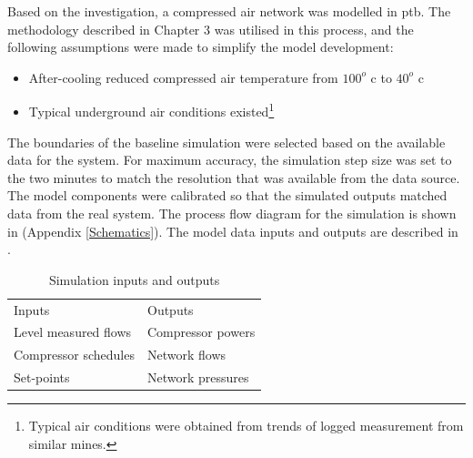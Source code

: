 Based on the investigation, a compressed air network was modelled in \gls{ptb}. The methodology described in Chapter 3 was utilised in this process, and the following assumptions were made to simplify the model development:
\begin{itemize}
	\item After-cooling reduced compressed air temperature from $ 100 ^o $ \gls{c} to $ 40 ^o $ \gls{c}
	\item Typical underground air conditions existed\footnote{Typical air conditions were obtained from trends of logged measurement from similar mines.}
\end{itemize}
 The boundaries of the baseline simulation were selected based on the available data for the system. For maximum accuracy, the simulation step size was set to the two minutes to match the resolution that was available from the data source.
The model components were calibrated so that the simulated outputs matched data from the real system. The process flow diagram for the simulation is shown in  (Appendix \ref{Schematics}). The model data inputs and outputs are described in .
\\
\begin{table}[h!]
	\caption{Simulation inputs and outputs}
	\centering
	\begin{tabular}{ll}
		\hline 
		Inputs \hspace*{4cm} & Outputs \hspace*{4cm} \\ \hhline{==}
		Level measured flows & Compressor powers \\
		Compressor schedules & Network flows \\
		Set-points & Network pressures \\
		\hline
	\end{tabular}
		
\label{table: Mine B inputs/outputs}
\end{table}
	

